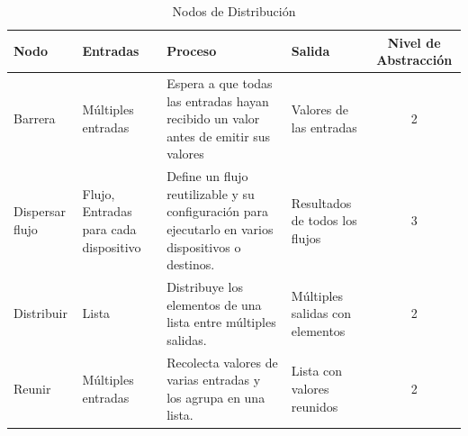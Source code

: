 \begin{table}[H]
    \centering
    \caption{Nodos de Distribución}
    \begin{tabularx}{\textwidth}{ l X X X c }
        \hline
        \textbf{Nodo}   & \textbf{Entradas}                     & \textbf{Proceso}                                                                                   & \textbf{Salida}                 & \textbf{Nivel de Abstracción} \\ \hline
        Barrera         & Múltiples entradas                    & Espera a que todas las entradas hayan recibido un valor antes de emitir sus valores                & Valores de las entradas         & 2                             \\
        Dispersar flujo & Flujo, Entradas para cada dispositivo & Define un flujo reutilizable y su configuración para ejecutarlo en varios dispositivos o destinos. & Resultados de todos los flujos  & 3                             \\
        Distribuir      & Lista                                 & Distribuye los elementos de una lista entre múltiples salidas.                                     & Múltiples salidas con elementos & 2                             \\
        Reunir          & Múltiples entradas                    & Recolecta valores de varias entradas y los agrupa en una lista.                                    & Lista con valores reunidos      & 2                             \\
        \hline
    \end{tabularx}
\end{table}

